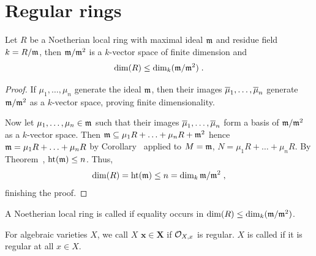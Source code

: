 \documentclass[a4paper,parskip=half,numbers=enddot, DIV=12]{scrreprt}
\begin{document}
\section{Regular rings}
\begin{prop}
    Let $R$ be a Noetherian local ring with maximal ideal $\mathfrak{m}$ and residue field $k=R/\mathfrak{m}$, then $\mathfrak{m}/\mathfrak{m}^2$ is a $k$-vector space of finite dimension and 
    \begin{align*}
    	\dim(R) \leq \dim_k(\mathfrak{m}/\mathfrak{m}^2)\;.
    \end{align*}
\end{prop}
\begin{proof}
    If $\mu_1,\ldots,\mu_n$ generate the ideal $\mathfrak{m}$, then their images $\overline{\mu}_1,\ldots,\overline{\mu}_n$ generate $\mathfrak{m}/\mathfrak{m}^2$ as a $k$-vector space, proving finite dimensionality. 
    
    Now let $\mu_1,\ldots,\mu_n\in\mathfrak{m}$ such that their images $\overline{\mu}_1,\ldots,\overline{\mu}_n$ form a basis of $\mathfrak{m}/\mathfrak{m}^2$ as a $k$-vector space. Then $\mathfrak{m} \subseteq \mu_1R+\ldots+\mu_nR+\mathfrak{m}^2$ hence $\mathfrak{m} = \mu_1R+\ldots+\mu_nR$ by Corollary~ applied to $M = \mathfrak{m}$, $N = \mu_1R+\ldots+\mu_nR$. By Theorem~, $\operatorname{ht}(\mathfrak{m}) \leq n$. Thus,
    \begin{align*}
    	\dim (R) = \operatorname{ht}(\mathfrak{m}) \leq n = \dim_k \mathfrak{m}/\mathfrak{m}^2\;,
    \end{align*}
    finishing the proof.
\end{proof}
\begin{defi}[Regularity]
	\begin{alphanumerate}
		\item A Noetherian local ring is called  if equality occurs in $\dim (R) \leq\dim_k(\mathfrak{m}/\mathfrak{m}^2)$. 
		\item For algebraic varieties $X$, we call $X$  $\boldsymbol{x\in X}$ if $\mathcal{O}_{X,x}$ is regular. $X$ is called  if it is regular at all $x\in X$.
	\end{alphanumerate}
\end{defi}
\end{document}
